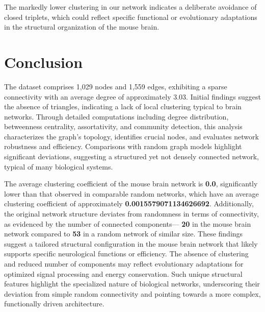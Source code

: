 \documentclass[
	report, %
	11pt, %
]{CSUniSchoolLabReport}
\begin{document}
	The markedly lower clustering in our network indicates a deliberate avoidance of closed triplets, which could reflect specific functional or evolutionary adaptations in the structural organization of the mouse brain.
	\pagebreak
	\section{Conclusion}

	The dataset comprises 1,029 nodes and 1,559 edges, exhibiting a sparse connectivity with an average degree of approximately 3.03. Initial findings suggest the absence of triangles, indicating a lack of local clustering typical to brain networks. Through detailed computations including degree distribution, betweenness centrality, assortativity, and community detection, this analysis characterizes the graph's topology, identifies crucial nodes, and evaluates network robustness and efficiency. Comparisons with random graph models highlight significant deviations, suggesting a structured yet not densely connected network, typical of many biological systems.

	The average clustering coefficient of the mouse brain network is \textbf{0.0}, significantly lower than that observed in comparable random networks, which have an average clustering coefficient of approximately \textbf{\num{0.0015579071134626692}}. Additionally, the original network structure deviates from randomness in terms of connectivity, as evidenced by the number of connected components— \textbf{20} in the mouse brain network compared to \textbf{53} in a random network of similar size. These findings suggest a tailored structural configuration in the mouse brain network that likely supports specific neurological functions or efficiency. The absence of clustering and reduced number of components may reflect evolutionary adaptations for optimized signal processing and energy conservation. Such unique structural features highlight the specialized nature of biological networks, underscoring their deviation from simple random connectivity and pointing towards a more complex, functionally driven architecture.
\end{document}
